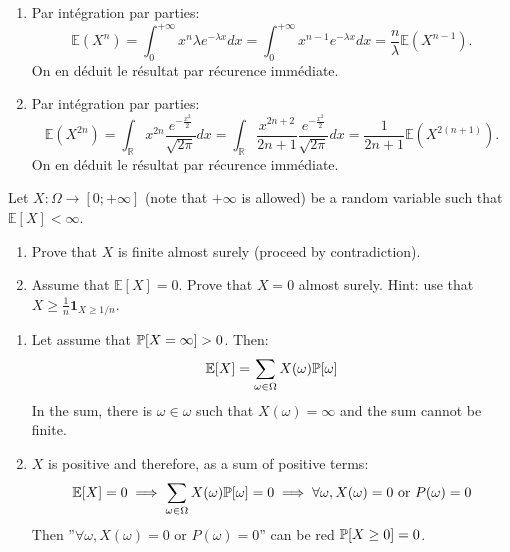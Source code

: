\begin{solution}
  \begin{enumerate}
    \item Par int\'{e}gration par parties:
          \[
            \mathbb{E}\left(X^{n}\right) = \int_{0}^{+\infty}x^{n}\lambda e^{-\lambda x}dx = \int_{0}^{+\infty}x^{n-1} e^{-\lambda x}dx = \frac{n}{\lambda}\mathbb{E}\left(X^{n-1}\right).
          \]
          On en d\'{e}duit le r\'{e}sultat par r\'{e}curence imm\'{e}diate.
    \item Par int\'{e}gration par parties:
          \[
            \mathbb{E}\left(X^{2n}\right) = \int_{\mathbb{R}}x^{2n}\frac{e^{-\frac{x^2}{2}}}{\sqrt{2\pi}}dx = \int_{\mathbb{R}}\frac{x^{2n+2}}{2n + 1}\frac{e^{-\frac{x^2}{2}}}{\sqrt{2\pi}}dx = \frac{1}{2n+1}\mathbb{E}\left(X^{2(n+1)}\right).
          \]
          On en d\'{e}duit le r\'{e}sultat par r\'{e}curence imm\'{e}diate.
  \end{enumerate}
\end{solution}

\begin{Exercise}
  Let $X: \Omega \rightarrow[0 ;+\infty]$ (note that $+\infty$ is allowed) be a random variable such that $\mathbb{E}[X]<\infty$.

  \begin{enumerate}
    \item Prove that $X$ is finite almost surely (proceed by contradiction).

    \item Assume that $\mathbb{E}[X]=0$. Prove that $X=0$ almost surely. Hint: use that $X \geq \frac{1}{n} \mathbf{1}_{X \geq 1 / n}$.
  \end{enumerate}
\end{Exercise}

\begin{solution}
  \begin{enumerate}
    \item Let assume that $\mathbb{P}[X = \infty] > 0$. Then:
          \[ \mathbb{E}[X] = \sum_{\omega \in \Omega} X(\omega) \mathbb{P}[\omega] \]
          In the sum, there is $\omega \in \omega$ such that $X(\omega) = \infty$ and the sum cannot be finite.
    \item $X$ is positive and therefore, as a sum of positive terms:
          \[\mathbb{E}[X] = 0 \implies \sum_{\omega \in \Omega} X(\omega) \mathbb{P}[\omega] = 0 \implies \forall \omega, X(\omega) = 0 \text{ or } P(\omega) = 0 \]
          Then ''$\forall \omega, X(\omega) = 0 \text{ or } P(\omega) = 0$'' can be red $\mathbb{P}[X \geq 0] = 0$.
  \end{enumerate}
\end{solution}